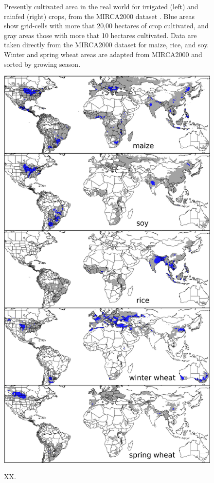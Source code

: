\documentclass[12pt]{article}
\begin{document}
\begin{figure}[h!]
\begin{minipage}{.45\textwidth}
    \caption{
	    Presently cultivated area in the real world for irrigated (left) and rainfed (right) crops, from the MIRCA2000 dataset \citep{Portmann2010}. 
    Blue areas show grid-cells with more that 20,00 hectares of crop cultivated, and 
    gray areas those with more that 10 hectares cultivated. Data are taken directly from the MIRCA2000 dataset  for maize, rice, and soy. 
    Winter and spring wheat areas are adapted from MIRCA2000 and sorted by growing season.
    }
    \label{fig:irrarea}
\end{minipage}
\hspace{.05\linewidth}
\begin{minipage}{.45\textwidth}
    \centering
    \vspace{-19mm}
    \includegraphics[width=\textwidth]{s_croparea.png}\\
    \caption{XX.}
    \label{fig:rainfed}
\end{minipage}
\end{figure}
\end{document}

